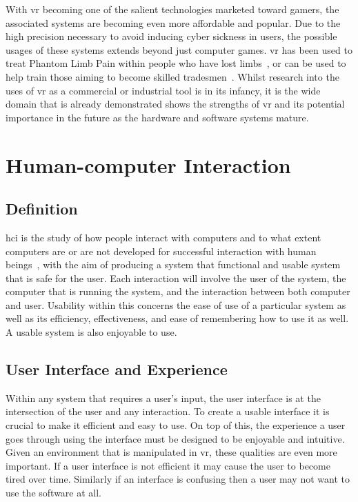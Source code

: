         With \acrshort{vr} becoming one of the salient technologies marketed toward gamers, the associated systems are becoming even more affordable and popular. Due to the high precision necessary to avoid inducing cyber sickness in users, the possible usages of these systems extends beyond just computer games. \acrshort{vr} has been used to treat Phantom Limb Pain within people who have lost limbs~\cite{ortiz2014treatment}, or can be used to help train those aiming to become skilled tradesmen~\cite{VrWelding2014}. Whilst research into the uses of \acrshort{vr} as a commercial or industrial tool is in its infancy, it is the wide domain that is already demonstrated shows the strengths of \acrshort{vr} and its potential importance in the future as the hardware and software systems mature.

\section{Human-computer Interaction}

    \subsection{Definition}
    
        \acrfull{hci} is the study of how people interact with computers and to what extent computers are or are not developed for successful interaction with human beings~\cite{HciDefinition2017}, with the aim of producing a system that functional and usable system that is safe for the user. Each interaction will involve the user of the system, the computer that is running the system, and the interaction between both computer and user. Usability within this concerns the ease of use of a particular system as well as its efficiency, effectiveness, and ease of remembering how to use it as well. A usable system is also enjoyable to use.
    
    \subsection{User Interface and Experience}
    
        Within any system that requires a user's input, the user interface is at the intersection of the user and any interaction. To create a usable interface it is crucial to make it efficient and easy to use. On top of this, the experience a user goes through using the interface must be designed to be enjoyable and intuitive. Given an environment that is manipulated in \acrshort{vr}, these qualities are even more important. If a user interface is not efficient it may cause the user to become tired over time. Similarly if an interface is confusing then a user may not want to use the software at all.

